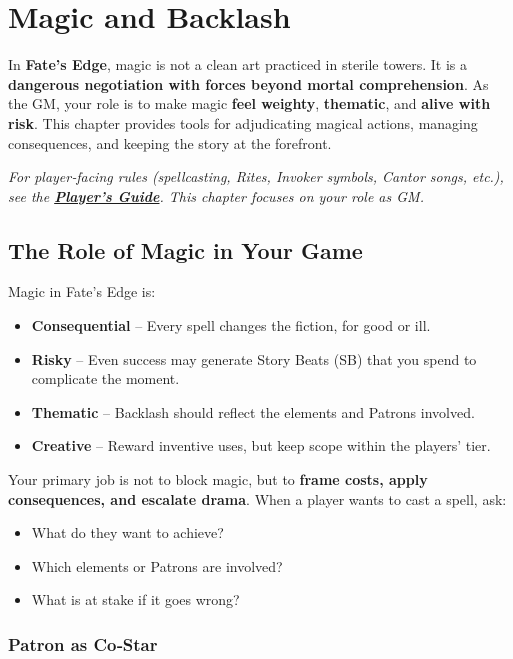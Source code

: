 \chapter{Magic and Backlash}
\label{ch:gm-magic}

In \textbf{Fate's Edge}, magic is not a clean art practiced in sterile towers. It is a \textbf{dangerous negotiation with forces beyond mortal comprehension}. As the GM, your role is to make magic \textbf{feel weighty}, \textbf{thematic}, and \textbf{alive with risk}. This chapter provides tools for adjudicating magical actions, managing consequences, and keeping the story at the forefront.

\emph{For player‑facing rules (spellcasting, Rites, Invoker symbols, Cantor songs, etc.), see the \textbf{\hyperref[ch:player-guide]{Player's Guide}}. This chapter focuses on your role as GM.}

\section{The Role of Magic in Your Game}
\label{sec:gm-magic-philosophy}

Magic in Fate’s Edge is:
\begin{itemize}
  \item \textbf{Consequential} – Every spell changes the fiction, for good or ill.
  \item \textbf{Risky} – Even success may generate Story Beats (SB) that you spend to complicate the moment.
  \item \textbf{Thematic} – Backlash should reflect the elements and Patrons involved.
  \item \textbf{Creative} – Reward inventive uses, but keep scope within the players’ tier.
\end{itemize}

Your primary job is not to block magic, but to \textbf{frame costs, apply consequences, and escalate drama}. When a player wants to cast a spell, ask:
\begin{itemize}
  \item What do they want to achieve?
  \item Which elements or Patrons are involved?
  \item What is at stake if it goes wrong?
\end{itemize}

\subsection{Patron as Co‑Star}
\label{subsec:patron-costar}

